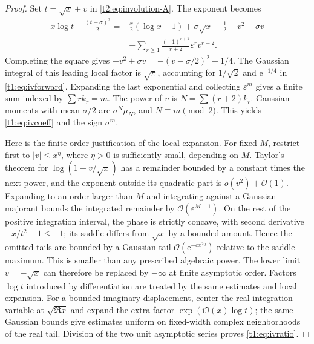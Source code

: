 \documentclass[11pt,openany]{book}
\numberwithin{equation}{chapter}
\theoremstyle{plain}
\theoremstyle{definition}
\theoremstyle{remark}
\newcommand{\ee}{\mathrm e}
\newcommand{\ii}{\mathrm i}
\newcommand{\OO}{\mathcal O}\newcommand{\bigO}{\mathcal O}
\begin{document}
\begin{proof}
Set $t=\sqrt x+v$ in \eqref{t2:eq:involution-A}. The exponent becomes
\begin{align*}
 x\log t-\frac{(t-\sigma)^2}{2}
 ={}&\frac x2(\log x-1)+\sigma\sqrt x-\frac12-v^2+\sigma v\\
 &+\sum_{r\ge1}\frac{(-1)^{r+1}}{r+2}\varepsilon^r v^{r+2}.
\end{align*}
Completing the square gives $-v^2+\sigma v=-(v-\sigma/2)^2+1/4$. The Gaussian integral of this leading local factor is $\sqrt\pi$, accounting for $1/\sqrt2$ and $\ee^{-1/4}$ in \eqref{t1:eq:ivforward}. Expanding the last exponential and collecting $\varepsilon^m$ gives a finite sum indexed by $\sum rk_r=m$. The power of $v$ is $N=\sum(r+2)k_r$. Gaussian moments with mean $\sigma/2$ are $\sigma^N\mu_N$, and $N\equiv m\pmod2$. This yields \eqref{t1:eq:ivcoeff} and the sign $\sigma^m$.

Here is the finite-order justification of the local expansion. For fixed $M$, restrict first to $|v|\le x^\eta$, where $\eta>0$ is sufficiently small, depending on $M$. Taylor's theorem for $\log(1+v/\sqrt x)$ has a remainder bounded by a constant times the next power, and the exponent outside its quadratic part is $o(v^2)+\OO(1)$. Expanding to an order larger than $M$ and integrating against a Gaussian majorant bounds the integrated remainder by $\OO(\varepsilon^{M+1})$. On the rest of the positive integration interval, the phase is strictly concave, with second derivative $-x/t^2-1\le-1$; its saddle differs from $\sqrt x$ by a bounded amount. Hence the omitted tails are bounded by a Gaussian tail $\OO(\ee^{-c x^{2\eta}})$ relative to the saddle maximum. This is smaller than any prescribed algebraic power. The lower limit $v=-\sqrt x$ can therefore be replaced by $-\infty$ at finite asymptotic order. Factors $\log t$ introduced by differentiation are treated by the same estimates and local expansion. For a bounded imaginary displacement, center the real integration variable at $\sqrt{\Re x}$ and expand the extra factor $\exp(\ii\Im(x)\log t)$; the same Gaussian bounds give estimates uniform on fixed-width complex neighborhoods of the real tail. Division of the two unit asymptotic series proves \eqref{t1:eq:ivratio}.
\end{proof}
\end{document}
